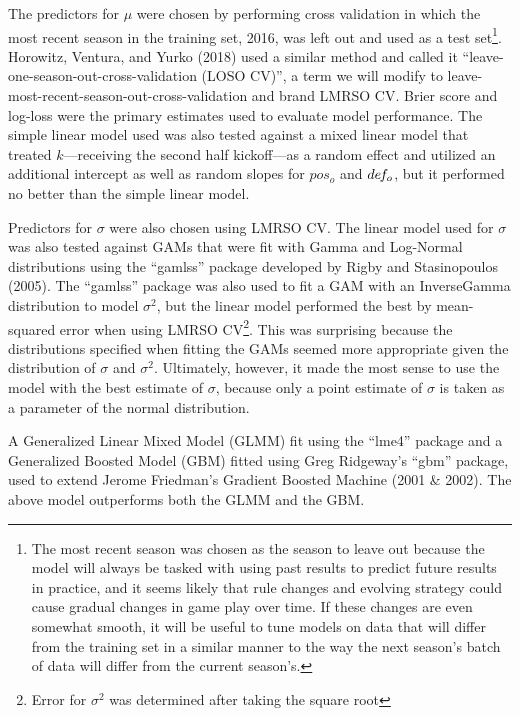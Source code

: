 \documentclass[12pt,twoside]{dukestatscithesis}
\begin{document}
The predictors for \(\mu\) were chosen by performing cross validation in which the most recent season in the training set, 2016, was left out and used as a test set\footnote{The most recent season was chosen as the season to leave out because the model will always be tasked with using past results to predict future results in practice, and it seems likely that rule changes and evolving strategy could cause gradual changes in game play over time. If these changes are even somewhat smooth, it will be useful to tune models on data that will differ from the training set in a similar manner to the way the next season's batch of data will differ from the current season's.}. Horowitz, Ventura, and Yurko (2018) used a similar method and called it ``leave-one-season-out-cross-validation (LOSO CV)'', a term we will modify to leave-most-recent-season-out-cross-validation and brand LMRSO CV. Brier score and log-loss were the primary estimates used to evaluate model performance. The simple linear model used was also tested against a mixed linear model that treated \(k\)---receiving the second half kickoff---as a random effect and utilized an additional intercept as well as random slopes for \(pos_o\) and \(de\hspace{-0.1em}f_o\), but it performed no better than the simple linear model.

Predictors for \(\sigma\) were also chosen using LMRSO CV. The linear model used for \(\sigma\) was also tested against GAMs that were fit with Gamma and Log-Normal distributions using the ``gamlss'' package developed by Rigby and Stasinopoulos (2005). The ``gamlss'' package was also used to fit a GAM with an InverseGamma distribution to model \(\sigma^{2}\), but the linear model performed the best by mean-squared error when using LMRSO CV\footnote{Error for \(\sigma^{2}\) was determined after taking the square root}. This was surprising because the distributions specified when fitting the GAMs seemed more appropriate given the distribution of \(\sigma\) and \(\sigma^{2}\). Ultimately, however, it made the most sense to use the model with the best estimate of \(\sigma\), because only a point estimate of \(\sigma\) is taken as a parameter of the normal distribution.

A Generalized Linear Mixed Model (GLMM) fit using the ``lme4'' package and a Generalized Boosted Model (GBM) fitted using Greg Ridgeway's ``gbm'' package, used to extend Jerome Friedman's Gradient Boosted Machine (2001 \& 2002). The above model outperforms both the GLMM and the GBM.
\end{document}
